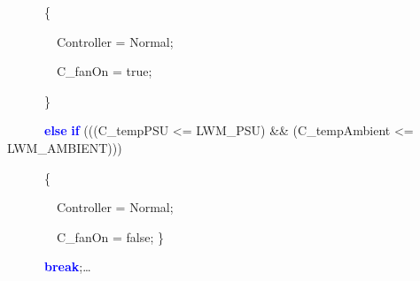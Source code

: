 \documentclass{llncs}%
\begin{document}
{\ttfamily
\ \ \ \ \ \ \{}

{\ttfamily
\ \ \ \ \ \ \ \ Controller = Normal;}

{\ttfamily
\ \ \ \ \ \ \ \ C\_fanOn = true;}

{\ttfamily
\ \ \ \ \ \ \}}

{\ttfamily
\ \ \ \ \ \ \textbf{\textcolor{blue}{else}}
\textbf{\textcolor{blue}{if}} (((C\_tempPSU {\textless}= LWM\_PSU) \&\&
(C\_tempAmbient {\textless}= LWM\_AMBIENT)))}

{\ttfamily
\ \ \ \ \ \ \{}

{\ttfamily
\ \ \ \ \ \ \ \ Controller = Normal;}

{\ttfamily
\ \ \ \ \ \ \ \ C\_fanOn = false; \}}

{\ttfamily
\ \ \ \ \ \ \textbf{\textcolor{blue}{break}};}\dots
\end{document}
